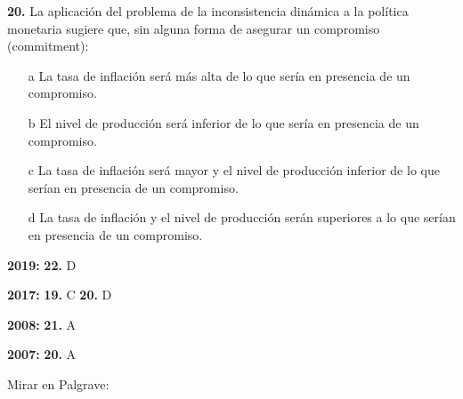 \documentclass{nuevotema}
\begin{document}
\textbf{20.} La aplicación del problema de la inconsistencia dinámica a la política monetaria sugiere que, sin alguna forma de asegurar un compromiso (commitment):
\begin{itemize}
	\item[a] La tasa de inflación será más alta de lo que sería en presencia de un compromiso.
	\item[b] El nivel de producción será inferior de lo que sería en presencia de un compromiso.
	\item[c] La tasa de inflación será mayor y el nivel de producción inferior de lo que serían en presencia de un compromiso.
	\item[d] La tasa de inflación y el nivel de producción serán superiores a lo que serían en presencia de un compromiso.
\end{itemize}

\notas

\textbf{2019:} \textbf{22.} D

\textbf{2017:} \textbf{19.} C \textbf{20.} D

\textbf{2008:} \textbf{21.} A

\textbf{2007:} \textbf{20.} A


\bibliografia


Mirar en Palgrave:
\end{document}
